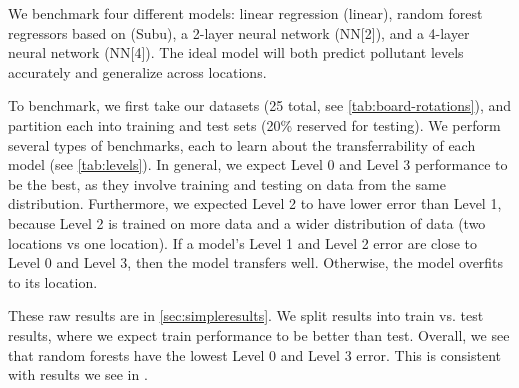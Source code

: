 \documentclass{article}
\begin{document}
We benchmark four different models: linear regression (linear), random forest regressors based on \cite{subu}(Subu),
a 2-layer neural network (NN[2]), and a 4-layer neural network (NN[4]). The ideal model will
both predict pollutant levels accurately and
generalize across locations.

To benchmark, we first take our datasets (25 total, see \autoref{tab:board-rotations}), and partition each into training and test sets (20\% reserved for testing).
We perform several types of benchmarks,
each to learn about the transferrability of each model (see \autoref{tab:levels}).
In general, we expect Level 0 and Level 3 performance to be the best, as they involve training and testing on data from the same distribution. Furthermore, we expected Level 2 to have lower error than Level 1, because Level 2 is trained on more data and a wider distribution of data (two locations vs one location).
If a model's Level 1 and Level 2 error are close to Level 0 and Level 3, then the model transfers well. Otherwise, the model overfits to its location.


These raw results are in \autoref{sec:simpleresults}. 
We split results into train vs. test
results, where we expect train performance
to be better than test.
Overall, we see that random forests have the lowest Level 0 and Level 3 error. This is consistent with results we see in \cite{subu}. 
\end{document}
